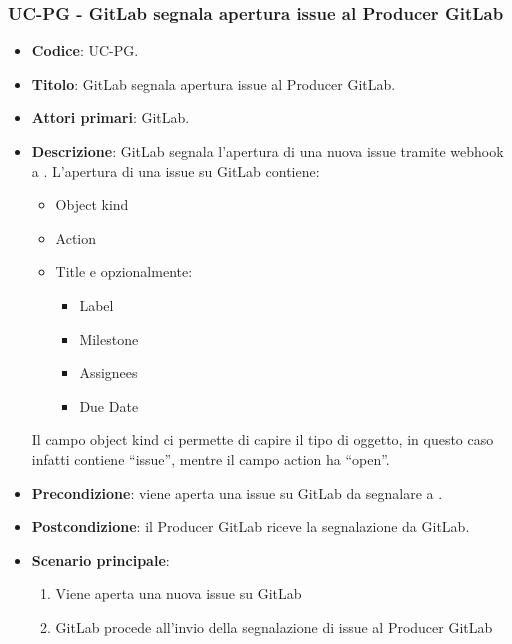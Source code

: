 \subsubsection{UC\theuccount-PG - GitLab segnala apertura issue al Producer GitLab}
	\begin{itemize}
		\item \textbf{Codice}: UC\theuccount-PG.
		\item \textbf{Titolo}: GitLab segnala apertura issue al Producer GitLab.
		\item \textbf{Attori primari}: GitLab.
		\item \textbf{Descrizione}: GitLab segnala l'apertura di una nuova issue tramite webhook a \progetto.
		L'apertura di una issue su GitLab contiene:
		\begin{itemize}
			\item Object kind
			\item Action
			\item Title e opzionalmente:
			\begin{itemize}
				\item Label
				\item Milestone
				\item Assignees
				\item Due Date
			\end{itemize}
		\end{itemize}
		Il campo object kind ci permette di capire il tipo di oggetto, in questo caso infatti contiene ``issue'', mentre il campo action ha ``open''.
		\item \textbf{Precondizione}: viene aperta una issue su GitLab da 
		segnalare a \progetto.
		\item \textbf{Postcondizione}: il Producer GitLab riceve la segnalazione da GitLab.
		\item \textbf{Scenario principale}: 
		\begin{enumerate}
			\item Viene aperta una nuova issue su GitLab
			\item GitLab procede all'invio della segnalazione di issue al Producer GitLab
		\end{enumerate}
		
	\end{itemize}